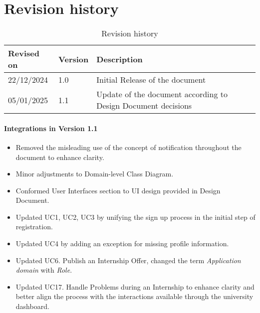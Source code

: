 \section{Revision history}
\label{sec:revision_history}%
\label{sec:definition_acronyms_abbreviations}%
\begin{table}[H]
    \begin{center}
        \begin{tabular}{ |l|l|l|}
            \hline
            \textbf{Revised on} & \textbf{Version}   & \textbf{Description}                           \\
            \hline
            22/12/2024             & 1.0   &   Initial Release of the document  \\
            \hline
            05/01/2025             & 1.1   &   Update of the document according to Design Document decisions  \\
            \hline
         \end{tabular}
         \caption{Revision history}
        \label{tab:acronyms}%
    \end{center}
\end{table}

\paragraph{Integrations in Version 1.1}
\begin{itemize}
    \item Removed the misleading use of the concept of notification throughout the document to enhance clarity.
    \item Minor adjustments to Domain-level Class Diagram.
    \item Conformed User Interfaces section to UI design provided in Design Document.
    \item Updated UC1, UC2, UC3 by unifying the sign up process in the initial step of registration.
    \item Updated UC4 by adding an exception for missing profile information.
    \item Updated UC6. Publish an Internship Offer, changed the term \textit{Application domain} with \textit{Role}.
    \item Updated UC17. Handle Problems during an Internship to enhance clarity and better align the process with the interactions available through the university dashboard.
\end{itemize}

\setcounter{bib}{1}
\newcommand{\cbib} {\thebib\stepcounter{bib}}

